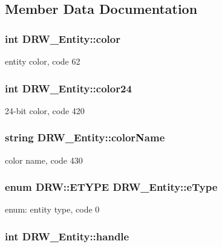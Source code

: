 \subsection{Member Data Documentation}
\hypertarget{classDRW__Entity_a199afc08d2cc4c44ea58d49780582526}{
\subsubsection[{color}]{\setlength{\rightskip}{0pt plus 5cm}int D\-R\-W\-\_\-\-Entity\-::color}}\label{classDRW__Entity_a199afc08d2cc4c44ea58d49780582526}
entity color, code 62 \hypertarget{classDRW__Entity_a4448fbdbe618f83ed71a7c1ed98caeae}{
\subsubsection[{color24}]{\setlength{\rightskip}{0pt plus 5cm}int D\-R\-W\-\_\-\-Entity\-::color24}}\label{classDRW__Entity_a4448fbdbe618f83ed71a7c1ed98caeae}
24-\/bit color, code 420 \hypertarget{classDRW__Entity_a67795f82419627d5d6b56b874dc29f59}{
\subsubsection[{color\-Name}]{\setlength{\rightskip}{0pt plus 5cm}string D\-R\-W\-\_\-\-Entity\-::color\-Name}}\label{classDRW__Entity_a67795f82419627d5d6b56b874dc29f59}
color name, code 430 \hypertarget{classDRW__Entity_a36dff42707384984a085dbea602d0217}{
\subsubsection[{e\-Type}]{\setlength{\rightskip}{0pt plus 5cm}enum D\-R\-W\-::\-E\-T\-Y\-P\-E D\-R\-W\-\_\-\-Entity\-::e\-Type}}\label{classDRW__Entity_a36dff42707384984a085dbea602d0217}
enum\-: entity type, code 0 \hypertarget{classDRW__Entity_a32f66a2b4da26f1f9a42ffa8539c916c}{
\subsubsection[{handle}]{\setlength{\rightskip}{0pt plus 5cm}int D\-R\-W\-\_\-\-Entity\-::handle}}\label{classDRW__Entity_a32f66a2b4da26f1f9a42ffa8539c916c}
